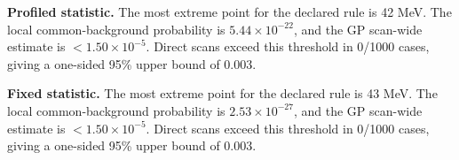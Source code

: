 \textbf{Profiled statistic.} The most extreme point for the declared rule is 42 MeV. The local common-background probability is $5.44\times10^{-22}$, and the GP scan-wide estimate is $<$$1.50\times10^{-5}$. Direct scans exceed this threshold in 0/1000 cases, giving a one-sided 95\% upper bound of 0.003.

\textbf{Fixed statistic.} The most extreme point for the declared rule is 43 MeV. The local common-background probability is $2.53\times10^{-27}$, and the GP scan-wide estimate is $<$$1.50\times10^{-5}$. Direct scans exceed this threshold in 0/1000 cases, giving a one-sided 95\% upper bound of 0.003.
